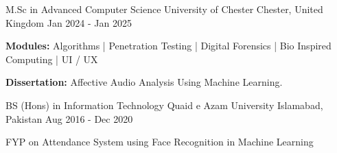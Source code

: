 \vspace{-2mm}


\begin{cventries}

    \cventry
    {M.Sc in Advanced Computer Science} %
    {University of Chester} %
    {Chester, United Kingdom} %
    {Jan 2024 - Jan 2025} %
    {
      \begin{cvitems} %
        \setlength{\itemindent}{+.1in}
        \item{\textbf{Modules:} Algorithms | Penetration Testing | Digital Forensics | Bio Inspired Computing | UI / UX}
        \item{\textbf{Dissertation:} Affective Audio Analysis Using Machine Learning.}
      \end{cvitems}
    }

    \cventry
    {BS (Hons) in Information Technology} %
    {Quaid e Azam University} %
    {Islamabad, Pakistan} %
    {Aug 2016 - Dec 2020} %
    {
      \begin{cvitems} %
        \setlength{\itemindent}{+.1in}
        \item {FYP on Attendance System using Face Recognition in Machine Learning}
      \end{cvitems}
    }

\end{cventries}

